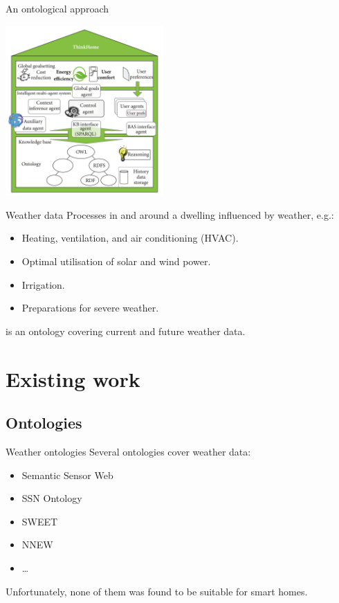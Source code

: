 \documentclass{beamer}
\begin{document}
\begin{frame}{An ontological approach}
	\begin{center}
		\vspace{-.5cm}
		\includegraphics[height=6.5cm]{figures/thinkhome}
	\end{center}
\end{frame}

\begin{frame}{Weather data}
	Processes in and around a dwelling influenced by weather, e.g.:
	\begin{itemize}
		\item Heating, ventilation, and air conditioning (HVAC).
		\item Optimal utilisation of solar and wind power.
		\item Irrigation.
		\item Preparations for severe weather.
	\end{itemize}
	\vspace{1em}
	\smarthomeweather is an ontology covering current and future weather data.
\end{frame}

\section{Existing work}

\subsection{Ontologies}

\begin{frame}{Weather ontologies}
	Several ontologies cover weather data:
	\begin{itemize}
		\item Semantic Sensor Web
		\item SSN Ontology
		\item SWEET
		\item NNEW
		\item …
	\end{itemize}
	\vspace{1em}
	Unfortunately, none of them was found to be suitable for smart homes.
\end{frame}
\end{document}
